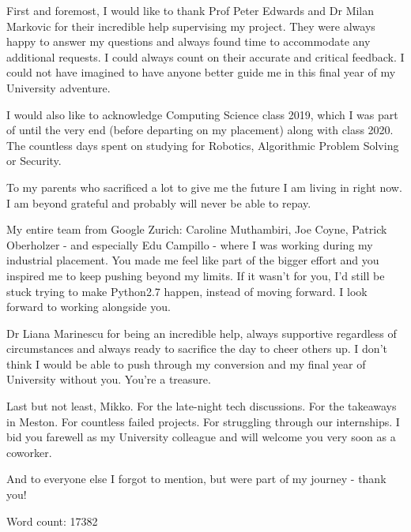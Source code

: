 \documentclass[msci]{abdnthesis}
\begin{document}
\begin{acknowledgements}
  First and foremost, I would like to thank Prof Peter Edwards and Dr Milan Markovic for their incredible help supervising my project. They were always happy to answer my questions and always found time to accommodate any additional requests. I could always count on their accurate and critical feedback. I could not have imagined to have anyone better guide me in this final year of my University adventure.

  I would also like to acknowledge Computing Science class 2019, which I was part of until the very end (before departing on my placement) along with class 2020. The countless days spent on studying for Robotics, Algorithmic Problem Solving or Security.

  To my parents who sacrificed a lot to give me the future I am living in right now. I am beyond grateful and probably will never be able to repay.

  My entire team from Google Zurich: Caroline Muthambiri, Joe Coyne, Patrick Oberholzer - and especially Edu Campillo - where I was working during my industrial placement. You made me feel like part of the bigger effort and you inspired me to keep pushing beyond my limits. If it wasn't for you, I'd still be stuck trying to make Python2.7 happen, instead of moving forward. I look forward to working alongside you.

  Dr Liana Marinescu for being an incredible help, always supportive regardless of circumstances and always ready to sacrifice the day to cheer others up. I don't think I would be able to push through my conversion and my final year of University without you. You're a treasure.

  Last but not least, Mikko. For the late-night tech discussions. For the takeaways in Meston. For countless failed projects. For struggling through our internships. I bid you farewell as my University colleague and will welcome you very soon as a coworker.

 And to everyone else I forgot to mention, but were part of my journey - thank you! 

  
\end{acknowledgements}



\tableofcontents\vfill Word count: 17382
\listoftables
\listoffigures

\printnoidxglossary[type=\acronymtype,title=Abbreviations,nonumberlist]









\appendix




\end{document}
